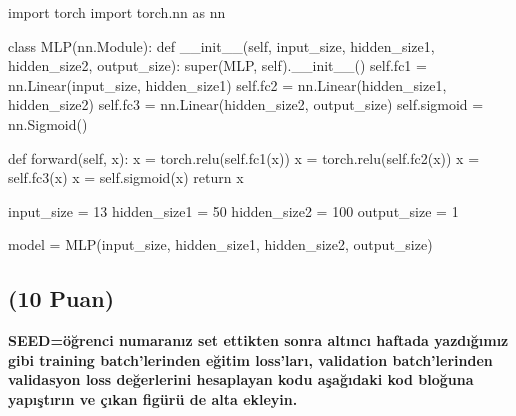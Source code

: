 \documentclass[11pt]{article}
\begin{document}
\begin{python}
import torch
import torch.nn as nn

class MLP(nn.Module):
    def __init__(self, input_size, hidden_size1, hidden_size2, output_size):
        super(MLP, self).__init__()
        self.fc1 = nn.Linear(input_size, hidden_size1)
        self.fc2 = nn.Linear(hidden_size1, hidden_size2)
        self.fc3 = nn.Linear(hidden_size2, output_size)
        self.sigmoid = nn.Sigmoid()
        
    def forward(self, x):
        x = torch.relu(self.fc1(x))
        x = torch.relu(self.fc2(x))
        x = self.fc3(x)
        x = self.sigmoid(x)
        return x
        
input_size = 13
hidden_size1 = 50
hidden_size2 = 100
output_size = 1

model = MLP(input_size, hidden_size1, hidden_size2, output_size)
\end{python}

\subsection{(10 Puan)} \textbf{SEED=öğrenci numaranız set ettikten sonra altıncı haftada yazdığımız gibi training batch'lerinden eğitim loss'ları, validation batch'lerinden validasyon loss değerlerini hesaplayan kodu aşağıdaki kod bloğuna yapıştırın ve çıkan figürü de alta ekleyin.}
\end{document}
